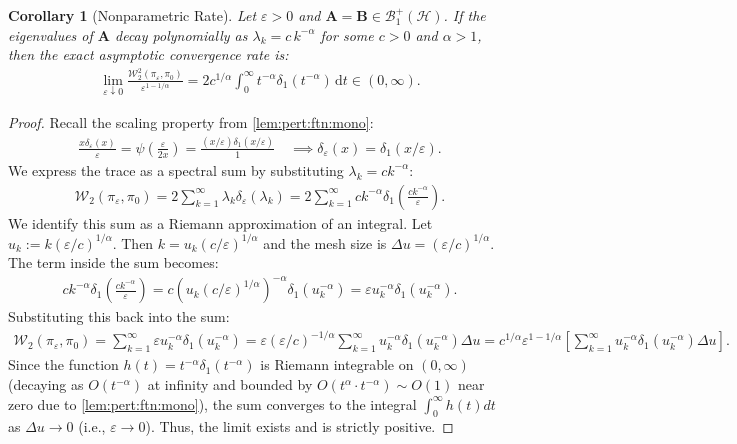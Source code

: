 \documentclass[noinfoline]{imsart}\setcounter{tocdepth}{2}
\newcommand{\m}[1]{\mathbf{#1}}
\renewcommand{\c}[1]{\mathcal{#1}}
\newcommand{\rd}{\mathrm{d}}
\theoremstyle{plain}
\newtheorem{corollary}[theorem]{Corollary}
\begin{document}
\begin{corollary}[Nonparametric Rate]
Let $\varepsilon > 0$ and $\m{A} = \m{B} \in \c{B}_{1}^{+}(\c{H})$. If the eigenvalues of $\m{A}$ decay polynomially as $\lambda_{k} = c \, k^{-\alpha}$ for some $c > 0$ and $\alpha > 1$, then the exact asymptotic convergence rate is:
\begin{align*}
    \lim_{\varepsilon \downarrow 0} \frac{\c{W}_{2}^{2}(\pi_{\varepsilon}, \pi_{0})}{\varepsilon^{1-1/\alpha}} = 2 c^{1/\alpha} \int_{0}^{\infty} t^{-\alpha} \delta_{1}(t^{-\alpha}) \, \rd t \in (0, \infty).
\end{align*}
\end{corollary}
\begin{proof}
Recall the scaling property from \cref{lem:pert:ftn:mono}:
\begin{align*}
    \frac{x \delta_{\varepsilon}(x)}{\varepsilon} = \psi \left( \frac{\varepsilon}{2x} \right) = \frac{(x/\varepsilon) \delta_{1}(x/\varepsilon)}{1} \quad \implies \delta_{\varepsilon}(x) = \delta_1(x/\varepsilon).
\end{align*}
We express the trace as a spectral sum by substituting $\lambda_k = c k^{-\alpha}$:
\begin{align*}
    \c{W}_{2}(\pi_{\varepsilon}, \pi_{0}) = 2 \sum_{k=1}^{\infty} \lambda_k \delta_{\varepsilon}(\lambda_k) = 2 \sum_{k=1}^{\infty} c k^{-\alpha} \delta_{1}\left( \frac{c k^{-\alpha}}{\varepsilon} \right).
\end{align*}
We identify this sum as a Riemann approximation of an integral. Let $u_k := k (\varepsilon/c)^{1/\alpha}$. Then $k = u_k (c/\varepsilon)^{1/\alpha}$ and the mesh size is $\Delta u = (\varepsilon/c)^{1/\alpha}$. The term inside the sum becomes:
\begin{align*}
    c k^{-\alpha} \delta_{1}\left( \frac{c k^{-\alpha}}{\varepsilon} \right) = c \left( u_k (c/\varepsilon)^{1/\alpha} \right)^{-\alpha} \delta_1(u_k^{-\alpha}) = \varepsilon u_k^{-\alpha} \delta_1(u_k^{-\alpha}).
\end{align*}
Substituting this back into the sum:
\begin{align*}
    \c{W}_{2}(\pi_{\varepsilon}, \pi_{0}) = \sum_{k=1}^{\infty} \varepsilon u_k^{-\alpha} \delta_1(u_k^{-\alpha}) 
    = \varepsilon (\varepsilon/c)^{-1/\alpha} \sum_{k=1}^{\infty} u_k^{-\alpha} \delta_1(u_k^{-\alpha}) \Delta u 
    = c^{1/\alpha} \varepsilon^{1-1/\alpha} \left[ \sum_{k=1}^{\infty} u_k^{-\alpha} \delta_1(u_k^{-\alpha}) \Delta u \right].
\end{align*}
Since the function $h(t) = t^{-\alpha} \delta_1(t^{-\alpha})$ is Riemann integrable on $(0, \infty)$ (decaying as $O(t^{-\alpha})$ at infinity and bounded by $O(t^\alpha \cdot t^{-\alpha}) \sim O(1)$ near zero due to \cref{lem:pert:ftn:mono}), the sum converges to the integral $\int_0^\infty h(t) dt$ as $\Delta u \to 0$ (i.e., $\varepsilon \to 0$). Thus, the limit exists and is strictly positive.
\end{proof}
\end{document}
